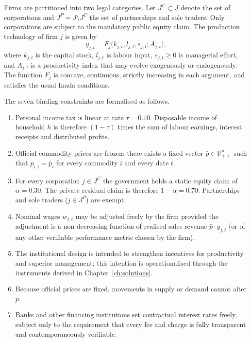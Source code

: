 \documentclass[12pt,anyside]{book}
\theoremstyle{definition}
\theoremstyle{plain}
\theoremstyle{remark}
\begin{document}
Firms are partitioned into two legal categories. Let $J^C\subset J$ denote the set of corporations and $J^P=J\setminus J^C$ the set of partnerships and sole traders. Only corporations are subject to the mandatory public equity claim. The production technology of firm $j$ is given by
\begin{equation}
y_{j,t}=F_j\bigl(k_{j,t},l_{j,t},e_{j,t};A_{j,t}\bigr),
\end{equation}
where $k_{j,t}$ is the capital stock, $l_{j,t}$ is labour input, $e_{j,t}\ge0$ is managerial effort, and $A_{j,t}$ is a productivity index that may evolve exogenously or endogenously. The function $F_j$ is concave, continuous, strictly increasing in each argument, and satisfies the usual Inada conditions.

The seven binding constraints are formalised as follows.

\begin{enumerate}[label=\arabic*)]
\item Personal income tax is linear at rate $\tau=0.10$. Disposable income of household $h$ is therefore $(1-\tau)$ times the sum of labour earnings, interest receipts and distributed profits.
\item Official commodity prices are frozen: there exists a fixed vector $\bar{p}\in\mathbb{R}_{++}^n$ such that $p_{i,t}=\bar{p}_i$ for every commodity $i$ and every date $t$.
\item For every corporation $j\in J^C$ the government holds a static equity claim of $\alpha=0.30$. The private residual claim is therefore $1-\alpha=0.70$. Partnerships and sole traders ($j\in J^P$) are exempt.
\item Nominal wages $w_{j,t}$ may be adjusted freely by the firm provided the adjustment is a non-decreasing function of realised sales revenue $\bar{p}\cdot y_{j,t}$ (or of any other verifiable performance metric chosen by the firm).
\item The institutional design is intended to strengthen incentives for productivity and superior management; this intention is operationalised through the instruments derived in Chapter~\ref{ch:solutions}.
\item Because official prices are fixed, movements in supply or demand cannot alter $\bar{p}$.
\item Banks and other financing institutions set contractual interest rates freely, subject only to the requirement that every fee and charge is fully transparent and contemporaneously verifiable.
\end{enumerate}
\end{document}
